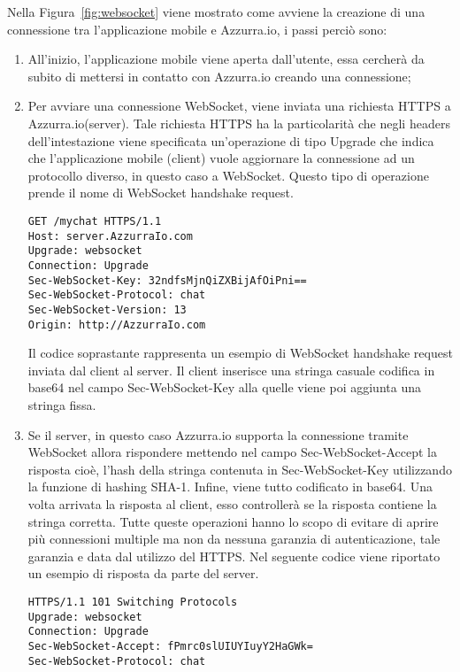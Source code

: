 Nella Figura~\ref{fig:websocket} viene mostrato come avviene la creazione di una connessione tra l'applicazione mobile e Azzurra.io, i passi perciò sono:
\begin{enumerate}
	\item All'inizio, l'applicazione mobile viene aperta dall'utente, essa cercherà da subito di mettersi in contatto con Azzurra.io creando una connessione;
	\item Per avviare una connessione WebSocket, viene inviata una richiesta HTTPS a Azzurra.io(server). Tale richiesta HTTPS ha la particolarità che negli headers dell’intestazione viene specificata un'operazione di tipo Upgrade che indica che l'applicazione mobile (client) vuole aggiornare la connessione ad un protocollo diverso, in questo caso a WebSocket. Questo tipo di operazione prende il nome di WebSocket handshake request.
	\begin{lstlisting}
GET /mychat HTTPS/1.1
Host: server.AzzurraIo.com
Upgrade: websocket	
Connection: Upgrade		
Sec-WebSocket-Key: 32ndfsMjnQiZXBijAfOiPni==
Sec-WebSocket-Protocol: chat		
Sec-WebSocket-Version: 13		
Origin: http://AzzurraIo.com
	\end{lstlisting}
	Il codice soprastante rappresenta un esempio di WebSocket handshake request inviata dal client al server. Il client inserisce una stringa casuale codifica in base64 nel campo Sec-WebSocket-Key alla quelle viene poi aggiunta una stringa fissa.
	\item Se il server, in questo caso Azzurra.io supporta la connessione tramite WebSocket allora rispondere mettendo nel campo Sec-WebSocket-Accept la risposta cioè, l'hash della stringa contenuta in Sec-WebSocket-Key utilizzando la funzione di hashing SHA-1. Infine, viene tutto codificato in base64. Una volta arrivata la risposta al client, esso controllerà se la risposta contiene la stringa corretta. Tutte queste operazioni hanno lo scopo di evitare di aprire più connessioni multiple ma non da nessuna garanzia di autenticazione, tale garanzia e data dal utilizzo del HTTPS.
	Nel seguente codice viene riportato un esempio di risposta da parte del server.
	\begin{lstlisting}
HTTPS/1.1 101 Switching Protocols
Upgrade: websocket
Connection: Upgrade
Sec-WebSocket-Accept: fPmrc0slUIUYIuyY2HaGWk=
Sec-WebSocket-Protocol: chat
	\end{lstlisting}
\end{enumerate}

